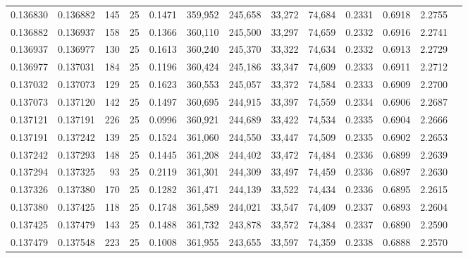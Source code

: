 \begin{tabular}{rrrrrrrrrrrrr}
0.136830 & 0.136882 &   145 &  25 &                                     0.1471 & 359,952 & 245,658 &  33,272 &  74,684 & 0.2331 & 0.6918 & 2.2755 \\
0.136882 & 0.136937 &   158 &  25 &                                     0.1366 & 360,110 & 245,500 &  33,297 &  74,659 & 0.2332 & 0.6916 & 2.2741 \\
0.136937 & 0.136977 &   130 &  25 &                                     0.1613 & 360,240 & 245,370 &  33,322 &  74,634 & 0.2332 & 0.6913 & 2.2729 \\
0.136977 & 0.137031 &   184 &  25 &                                     0.1196 & 360,424 & 245,186 &  33,347 &  74,609 & 0.2333 & 0.6911 & 2.2712 \\
0.137032 & 0.137073 &   129 &  25 &                                     0.1623 & 360,553 & 245,057 &  33,372 &  74,584 & 0.2333 & 0.6909 & 2.2700 \\
0.137073 & 0.137120 &   142 &  25 &                                     0.1497 & 360,695 & 244,915 &  33,397 &  74,559 & 0.2334 & 0.6906 & 2.2687 \\
0.137121 & 0.137191 &   226 &  25 &                                     0.0996 & 360,921 & 244,689 &  33,422 &  74,534 & 0.2335 & 0.6904 & 2.2666 \\
0.137191 & 0.137242 &   139 &  25 &                                     0.1524 & 361,060 & 244,550 &  33,447 &  74,509 & 0.2335 & 0.6902 & 2.2653 \\
0.137242 & 0.137293 &   148 &  25 &                                     0.1445 & 361,208 & 244,402 &  33,472 &  74,484 & 0.2336 & 0.6899 & 2.2639 \\
0.137294 & 0.137325 &    93 &  25 &                                     0.2119 & 361,301 & 244,309 &  33,497 &  74,459 & 0.2336 & 0.6897 & 2.2630 \\
0.137326 & 0.137380 &   170 &  25 &                                     0.1282 & 361,471 & 244,139 &  33,522 &  74,434 & 0.2336 & 0.6895 & 2.2615 \\
0.137380 & 0.137425 &   118 &  25 &                                     0.1748 & 361,589 & 244,021 &  33,547 &  74,409 & 0.2337 & 0.6893 & 2.2604 \\
0.137425 & 0.137479 &   143 &  25 &                                     0.1488 & 361,732 & 243,878 &  33,572 &  74,384 & 0.2337 & 0.6890 & 2.2590 \\
0.137479 & 0.137548 &   223 &  25 &                                     0.1008 & 361,955 & 243,655 &  33,597 &  74,359 & 0.2338 & 0.6888 & 2.2570 \\

\end{tabular}
